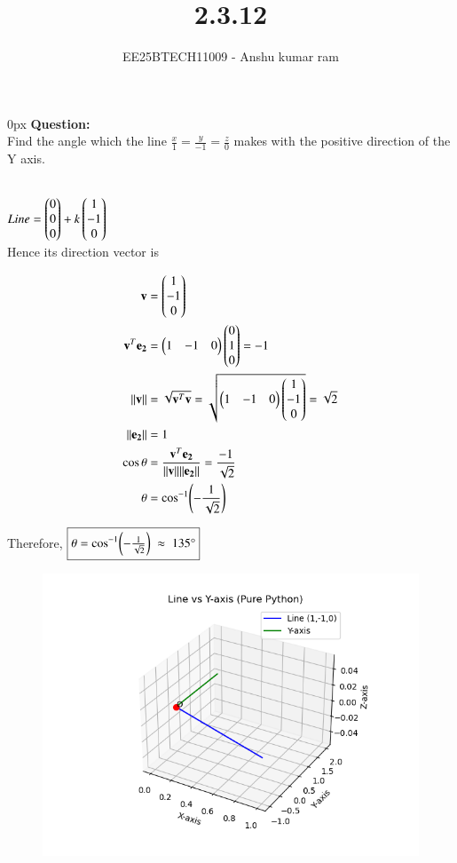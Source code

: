 \documentclass[journal]{IEEEtran}
\begin{document}

\vspace{3cm}

\title{2.3.12}
\author{EE25BTECH11009 - Anshu kumar ram}
{\let\newpage\relax\maketitle}

\renewcommand{\thefigure}{\theenumi}
\renewcommand{\thetable}{\theenumi}
\setlength{\intextsep}{10pt}
\renewcommand{\thetable}{\theenumi}

\parindent 0px
\textbf{Question:} \\
Find the angle which the line $\frac{x}{1}=\frac{y}{-1}=\frac{z}{0}$ makes with the positive direction of the Y axis.

\solution \\

   
$ Line = \begin{pmatrix}0\\0\\0\end{pmatrix} + k \begin{pmatrix}1\\-1\\0\end{pmatrix}$ 
\\

Hence its direction vector is

\begin{align}
\mathbf{v} &= \begin{pmatrix}1\\-1\\0\end{pmatrix} \\
\mathbf{v}^T\mathbf{e_2} &= 
\begin{pmatrix}1 & -1 & 0\end{pmatrix}\begin{pmatrix}0\\1\\0\end{pmatrix}=-1 \\
\|\mathbf{v}\| &= 
\sqrt{\mathbf{v}^T\mathbf{v}}
=\sqrt{\begin{pmatrix}1 & -1 & 0\end{pmatrix}\begin{pmatrix}1\\-1\\0\end{pmatrix}}=\sqrt{2} \\
\|\mathbf{e_2}\| &=1 \\
\cos\theta &= 
\frac{\mathbf{v}^T\mathbf{e_2}}{\|\mathbf{v}\|\|\mathbf{e_2}\|}
=\frac{-1}{\sqrt{2}} \\
\theta &= \cos^{-1}\!\left(-\frac{1}{\sqrt{2}}\right)
\end{align}

Therefore,
$
\boxed{\theta=\cos^{-1}\!\left(-\tfrac{1}{\sqrt{2}}\right)\;\approx\;135\degree}
$

\begin{figure}[ht!]
\centering
\includegraphics[width=\columnwidth, height=0.8\textheight, keepaspectratio]{figs/line.png}
\end{figure}
\end{document}
